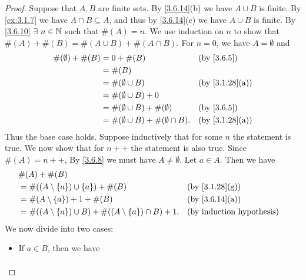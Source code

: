 \begin{proof}
  Suppose that \(A, B\) are finite sets.
  By \cref{3.6.14}(b) we have \(A \cup B\) is finite.
  By \cref{ex:3.1.7} we have \(A \cap B \subseteq A\), and thus by \cref{3.6.14}(c) we have \(A \cup B\) is finite.
  By \cref{3.6.10} \(\exists\ n \in \N\) such that \(\#(A) = n\).
  We use induction on \(n\) to show that \(\#(A) + \#(B) = \#(A \cup B) + \#(A \cap B)\).
  For \(n = 0\), we have \(A = \emptyset\) and
  \begin{align*}
    \#(\emptyset) + \#(B) & = 0 + \#(B)                                    &  & \text{(by \cref{3.6.5})}     \\
                          & = \#(B)                                                                          \\
                          & = \#(\emptyset \cup B)                         &  & \text{(by \cref{3.1.28}(a))} \\
                          & = \#(\emptyset \cup B) + 0                                                       \\
                          & = \#(\emptyset \cup B) + \#(\emptyset)         &  & \text{(by \cref{3.6.5})}     \\
                          & = \#(\emptyset \cup B) + \#(\emptyset \cap B). &  & \text{(by \cref{3.1.28}(a))}
  \end{align*}
  Thus the base case holds.
  Suppose inductively that for some \(n\) the statement is true.
  We now show that for \(n++\) the statement is also true.
  Since \(\#(A) = n++\), By \cref{3.6.8} we must have \(A \neq \emptyset\).
  Let \(a \in A\).
  Then we have
  \begin{align*}
     & \#(A) + \#(B)                                                                                                \\
     & = \#((A \setminus \{a\}) \cup \{a\}) + \#(B)                           &  & \text{(by \cref{3.1.28}(g))}     \\
     & = \#(A \setminus \{a\}) + 1 + \#(B)                                    &  & \text{(by \cref{3.6.14}(a))}     \\
     & = \#((A \setminus \{a\}) \cup B) + \#((A \setminus \{a\}) \cap B) + 1. &  & \text{(by induction hypothesis)}
  \end{align*}
  We now divide into two cases:
  \begin{itemize}
    \item If \(a \in B\), then we have
          \begin{align*}

\end{align*}
\end{itemize}
\end{proof}
